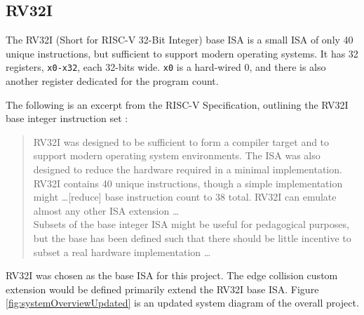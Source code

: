         

\subsection{RV32I}
    The RV32I (Short for RISC-V 32-Bit Integer) base \gls{ISA} is a small \gls{ISA} of only 40 unique instructions, but sufficient to support modern operating systems. It has 32 registers, \texttt{x0-x32}, each 32-bits wide. \texttt{x0} is a hard-wired 0, and there is also another register dedicated for the program count. 


    The following is an excerpt from the RISC-V Specification, outlining the RV32I base integer instruction set \cite{Waterman2019}:
    \begin{quote}{}
        \small{RV32I was designed to be sufficient to form a compiler target and to support modern operating system environments. The ISA was also designed to reduce the hardware required in a minimal implementation. RV32I contains 40 unique instructions, though a simple implementation might \dots [reduce] base instruction count to 38 total. RV32I can emulate almost any other ISA extension \dots \\
        Subsets of the base integer ISA might be useful for pedagogical purposes, but the base has been defined such that there should be little incentive to subset a real hardware implementation \dots}
    \end{quote}

    RV32I was chosen as the base ISA for this project. The edge collision custom extension would be defined primarily extend the RV32I base ISA. Figure \ref{fig:systemOverviewUpdated} is an updated system diagram of the overall project.

    




